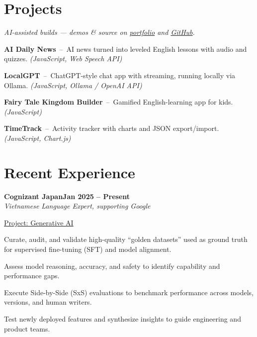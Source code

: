 \documentclass[letterpaper,10pt]{article}
\newcommand{\heading}[2]{
  \hspace{10pt}#1\hfill#2\\
}
\newcommand{\headingBf}[2]{
  \heading{\textbf{#1}}{\textbf{#2}}
}
\newcommand{\headingIt}[2]{
  \heading{\textit{#1}}{\textit{#2}}
}
\newenvironment{resume_list}{
  \vspace{-7pt}
  \begin{itemize}[itemsep=-2px, parsep=1pt, leftmargin=30pt]
}{
  \end{itemize}
}
\newcommand{\itemTitle}[1]{
  \item[] \underline{#1}\vspace{4pt}
}
\begin{document}

  \section{Projects}
  \vspace{3pt}
  {\textit{AI-assisted builds --- demos \& source on \href{https://hangnghiem.github.io/nghiemhang/}{portfolio} and \href{https://github.com/hangnghiem}{GitHub}.}}\\
  \vspace{-3pt}
  \begin{resume_list}
    \item \textbf{AI Daily News} \,--\, AI news turned into leveled English lessons with audio and quizzes. \textit{(JavaScript, Web Speech API)}
    \item \textbf{LocalGPT} \,--\, ChatGPT-style chat app with streaming, running locally via Ollama. \textit{(JavaScript, Ollama / OpenAI API)}
    \item \textbf{Fairy Tale Kingdom Builder} \,--\, Gamified English-learning app for kids. \textit{(JavaScript)}
    \item \textbf{TimeTrack} \,--\, Activity tracker with charts and JSON export/import. \textit{(JavaScript, Chart.js)}
  \end{resume_list}


  \section{Recent Experience}

  \headingBf{Cognizant Japan}{Jan 2025 -- Present}
  \headingIt{Vietnamese Language Expert, supporting Google}{}
  \begin{resume_list}
  
  \itemTitle{Project: Generative AI}
    \item {Curate, audit, and validate high-quality ``golden datasets'' used as ground truth for supervised fine-tuning (SFT) and model alignment.}
    \item {Assess model reasoning, accuracy, and safety to identify capability and performance gaps.}
    \item {Execute Side-by-Side (SxS) evaluations to benchmark performance across models, versions, and human writers.}
    \item {Test newly deployed features and synthesize insights to guide engineering and product teams.}
    
  \end{resume_list}
  
\end{document}
